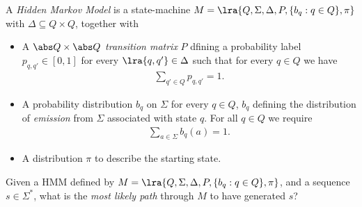 \documentclass{article}
\begin{document}
\begin{definition}[L19]
	A \emph{Hidden Markov Model} is a state-machine $M=\lra{Q, \Sigma, \Delta, P, 
	\{b_q:q\in Q\}, \pi}$ with $\Delta\subseteq Q\times Q$, together with
	\begin{itemize}
		\item A $\abs Q \times \abs Q$ \emph{transition matrix} $P$ dfining a
			probability label $p_{q,q'}\in[0,1]$ for every $\lra{q,q'}\in\Delta$
			such that for every $q\in Q$ we have \begin{align*}
				\sum_{q'\in Q}p_{q,q'} = 1.
			\end{align*}
        \item A probability distribution $b_q$ on $\Sigma$ for every $q\in Q$,
			$b_q$ defining the distribution of \emph{emission} from $\Sigma$
			associated with state $q$. For all $q\in Q$ we require \begin{align*}
				\sum_{a\in\Sigma} b_q(a) = 1.
			\end{align*}
        \item A distribution $\pi$ to describe the starting state.
	\end{itemize}
\end{definition}

\begin{definition}
	Given a HMM defined by $M=\lra{Q,\Sigma,\Delta,P,\{b_q:q\in Q\},\pi}$, and
	a sequence $s\in\Sigma^*$, what is the \emph{most likely path} through $M$
	to have generated $s$?	
\end{definition}
\end{document}
